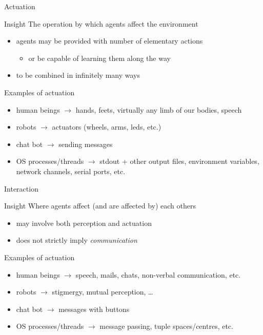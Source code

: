 \documentclass[presentation]{beamer}\mode<presentation>{\usetheme{AMSBolognaFC}}
\begin{document}
\begin{frame}[c]{Actuation}
%
\begin{block}{Insight}
	The operation by which agents affect the environment
	\begin{itemize}
		\item agents may be provided with number of elementary actions
		\begin{itemize}
			\item or be capable of learning them along the way
		\end{itemize}
		\item to be combined in infinitely many ways
	\end{itemize}
\end{block}
%
\begin{exampleblock}{Examples of actuation}
	\begin{itemize}
		\item human beings $\rightarrow$ hands, feets, virtually any limb of our bodies, speech
		\item robots $\rightarrow$ actuators (wheels, arms, leds, etc.)
		\item chat bot $\rightarrow$ sending messages
		\item OS processes/threads $\rightarrow$ stdout + other output files, environment variables, network channels, serial ports, etc.
	\end{itemize}
\end{exampleblock}
%
\end{frame}

\begin{frame}[c]{Interaction}
%
\begin{block}{Insight}
	Where agents affect (and are affected by) each others
	\begin{itemize}
		\item may involve both perception and actuation
		\item does not strictly imply \emph{communication}
	\end{itemize}
\end{block}
%
\begin{exampleblock}{Examples of actuation}
	\begin{itemize}
		\item human beings $\rightarrow$ speech, mails, chats, non-verbal communication, etc.
		\item robots $\rightarrow$ stigmergy, mutual perception, \ldots
		\item chat bot $\rightarrow$ messages with buttons
		\item OS processes/threads $\rightarrow$ message passing, tuple spaces/centres, etc.
	\end{itemize}
\end{exampleblock}
%
\end{frame}
\end{document}
